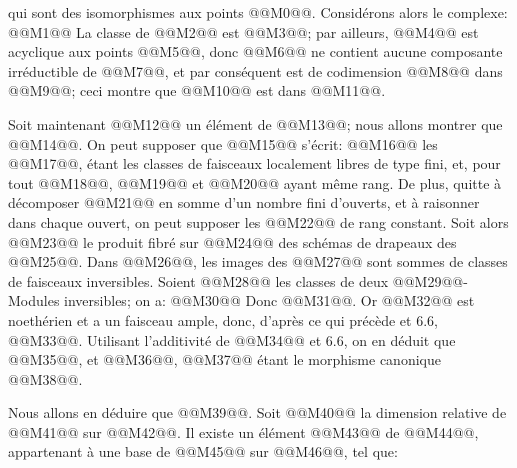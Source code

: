 
qui
sont des isomorphismes aux points @@M0@@. Considérons alors le complexe:
@@M1@@
La classe de @@M2@@ est @@M3@@; par ailleurs, @@M4@@ est acyclique aux points @@M5@@, donc @@M6@@ ne contient aucune composante irréductible de @@M7@@, et par conséquent est de codimension @@M8@@ dans @@M9@@; ceci montre que @@M10@@ est dans @@M11@@.

Soit maintenant @@M12@@ un élément de @@M13@@; nous allons montrer que @@M14@@. On peut supposer que @@M15@@ s'écrit:
@@M16@@
les @@M17@@, étant les classes de faisceaux localement libres de type fini, et, pour tout @@M18@@, @@M19@@ et @@M20@@ ayant même rang. De plus, quitte à décomposer @@M21@@ en somme d'un nombre fini d'ouverts, et à raisonner dans chaque ouvert, on peut supposer les @@M22@@ de rang constant. Soit alors @@M23@@ le produit fibré sur @@M24@@ des schémas de drapeaux des @@M25@@. Dans @@M26@@, les images des @@M27@@ sont sommes de classes de faisceaux inversibles. Soient @@M28@@ les classes de deux @@M29@@-Modules inversibles; on a:
@@M30@@
Donc @@M31@@. Or @@M32@@ est noethérien et a un faisceau ample, donc, d'après ce qui précède et 6.6, @@M33@@. Utilisant l'additivité de @@M34@@ et 6.6, on en déduit que @@M35@@, et @@M36@@, @@M37@@ étant le morphisme canonique @@M38@@.

Nous allons en déduire que @@M39@@. Soit @@M40@@ la dimension relative de @@M41@@ sur @@M42@@. Il existe un élément @@M43@@ de @@M44@@, appartenant à une base de @@M45@@ sur @@M46@@, tel que:
